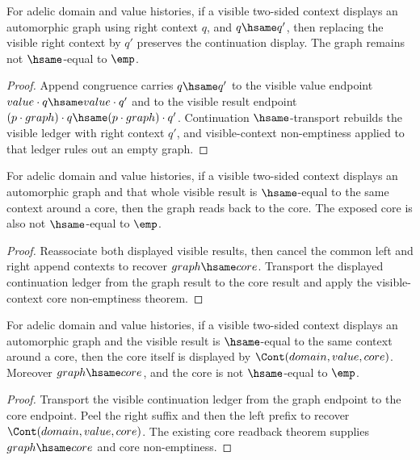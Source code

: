 \begin{theorem}
\label{thm:automorphic-adele-graph-visible-context-right-hsame-transport}
For adelic domain and value histories, if a visible two-sided context displays
an automorphic graph using right context $q$, and $q\hsame q'$, then replacing
the visible right context by $q'$ preserves the continuation display. The graph
remains not $\hsame$-equal to $\emp$.
\end{theorem}
\begin{proof}
Append congruence carries $q\hsame q'$ to the visible value endpoint
$value\cdot q\hsame value\cdot q'$ and to the visible result endpoint
$(p\cdot graph)\cdot q\hsame (p\cdot graph)\cdot q'$. Continuation
$\hsame$-transport rebuilds the visible ledger with right context $q'$, and
visible-context non-emptiness applied to that ledger rules out an empty graph.
\end{proof}

\begin{theorem}
\label{thm:automorphic-adele-graph-visible-context-core-readback}
For adelic domain and value histories, if a visible two-sided context displays
an automorphic graph and that whole visible result is $\hsame$-equal to the
same context around a core, then the graph reads back to the core. The exposed
core is also not $\hsame$-equal to $\emp$.
\end{theorem}
\begin{proof}
Reassociate both displayed visible results, then cancel the common left and
right append contexts to recover $graph\hsame core$. Transport the displayed
continuation ledger from the graph result to the core result and apply the
visible-context core non-emptiness theorem.
\end{proof}

\begin{theorem}
\label{thm:automorphic-adele-graph-visible-context-core-cont-readback}
For adelic domain and value histories, if a visible two-sided context displays
an automorphic graph and the visible result is $\hsame$-equal to the same
context around a core, then the core itself is displayed by
$\Cont(domain,value,core)$. Moreover $graph\hsame core$, and the core is not
$\hsame$-equal to $\emp$.
\end{theorem}
\begin{proof}
Transport the visible continuation ledger from the graph endpoint to the core
endpoint. Peel the right suffix and then the left prefix to recover
$\Cont(domain,value,core)$. The existing core readback theorem supplies
$graph\hsame core$ and core non-emptiness.
\end{proof}


